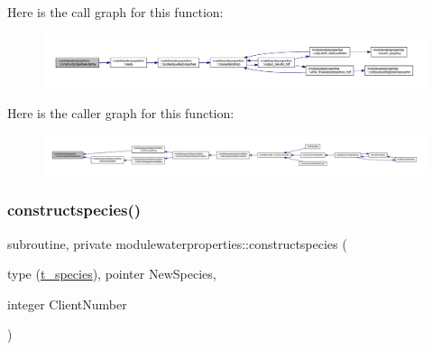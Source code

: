 Here is the call graph for this function\+:\nopagebreak
\begin{figure}[H]
\begin{center}
\leavevmode
\includegraphics[width=350pt]{namespacemodulewaterproperties_aa292f8dd2fd9a4ac03ea1234db030644_cgraph}
\end{center}
\end{figure}
Here is the caller graph for this function\+:\nopagebreak
\begin{figure}[H]
\begin{center}
\leavevmode
\includegraphics[width=350pt]{namespacemodulewaterproperties_aa292f8dd2fd9a4ac03ea1234db030644_icgraph}
\end{center}
\end{figure}
\mbox{\label{namespacemodulewaterproperties_a34a1aa06efecd62c35348355c7bab36e}} 
\subsubsection{\texorpdfstring{constructspecies()}{constructspecies()}}
{\footnotesize\ttfamily subroutine, private modulewaterproperties\+::constructspecies (\begin{DoxyParamCaption}\item[{type (\mbox{\hyperlink{structmodulewaterproperties_1_1t__species}{t\+\_\+species}}), pointer}]{New\+Species,  }\item[{integer}]{Client\+Number }\end{DoxyParamCaption})\hspace{0.3cm}{\ttfamily [private]}}

